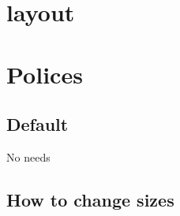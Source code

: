 \documentclass[a4paper,12pt]{article}
\begin{document}
\section{layout}
\layout


\newpage
\section{Polices}
\subsection{Default}
No needs
\subsection{How to change sizes}
\end{document}
